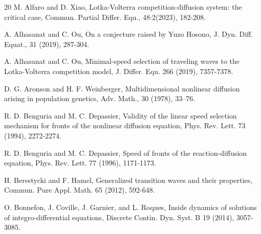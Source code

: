 \documentclass[11pt,a4paper]{article}
\numberwithin{equation}{section}
\numberwithin{figure}{section}
\begin{document}
\begin{thebibliography}{20}%
%
%
{M. Alfaro and D. Xiao},
Lotka-Volterra competition-diffusion system: the critical case, Commun. Partial Differ. Equ., 48:2(2023), 182-208.

{A. Alhasanat and C. Ou}, On a conjecture raised by Yuzo Hosono,
 J. Dyn. Diff. Equat., 31 (2019), 287-304.

{A. Alhasanat and C. Ou}, Minimal-speed selection of traveling waves to the Lotka-Volterra
competition model, J. Differ. Equ. 266 (2019), 7357-7378.





{D. G. Aronson and H. F. Weinberger},
Multidimensional nonlinear diffusion arising
in population genetics,
Adv. Math., 30 (1978), 33--76.



{R. D. Benguria and M. C. Depassier},
Validity of the linear speed selection mechanism for fronts of the nonlinear diffusion equation,
Phys. Rev. Lett. 73 (1994), 2272-2274.

{R. D. Benguria and M. C. Depassier},
Speed of fronts of the reaction-diffusion equation,
Phys. Rev. Lett. 77 (1996), 1171-1173.



{H. Berestycki and F. Hamel}, Generalized transition waves and their properties,
Commun. Pure Appl. Math. 65 (2012), 592-648.

{O. Bonnefon, J. Coville, J. Garnier, and L. Roques}, Inside dynamics of solutions of integro-differential equations, Discrete Contin. Dyn. Syst. B 19 (2014), 3057-3085.



\end{thebibliography}
\end{document}
